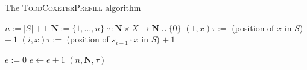 \begin{algorithm}
\caption{The \textsc{ToddCoxeterPrefill} algorithm}
\label{alg:tc-prefill}
\begin{algorithmic}[1]
\State $n := |S| + 1$
\State $\mathbf{N} := \{1, \ldots, n\}$
\State $\tau : \mathbf{N} \times X \to \mathbf{N} \cup \{0\}$
  \State $(1, x)\tau :=$ (position of $x$ in $S$) $+~1$
    \State $(i, x)\tau :=$ (position of $s_{i-1} \cdot x$ in $S$) $+~1$
  \EndFor
\EndFor

\State $e := 0$
\Repeat
  \State $e \gets e + 1$
      \State {}
    \EndFor
  \EndIf
{}  
\State \Return $(n, \mathbf{N}, \tau)$

\EndProcedure
\end{algorithmic}
\end{algorithm}

